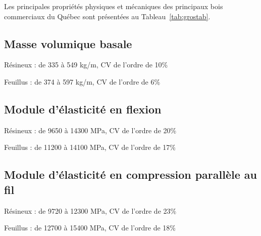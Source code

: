 Les principales propriétés physiques et mécaniques des principaux bois commerciaux du Québec sont présentées au Tableau~\ref{tab:grostab}. 

\subsection{Masse volumique basale}

Résineux : de 335 à 549 kg/m, CV de l'ordre de 10\%

Feuillus : de 374 à 597 kg/m, CV de l'ordre de 6\%

\subsection{Module d'élasticité en flexion}

Résineux : de 9650 à 14300 MPa, CV de l'ordre de 20\%

Feuillus : de 11200 à 14100 MPa, CV de l'ordre de 17\%

\subsection{Module d'élasticité en compression parallèle au fil}

Résineux : de 9720 à 12300 MPa, CV de l'ordre de 23\%

Feuillus : de 12700 à 15400 MPa, CV de l'ordre de 18\%

